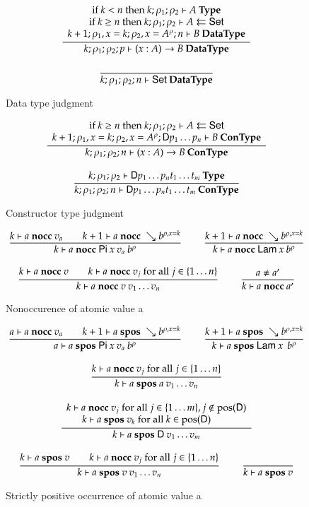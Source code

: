 \newcommand{\nocc}[3]{#1\vdash#2\mbox{ \textbf{nocc} }#3}

\begin{figure}
\begin{gather*}
\ \dfrac{\begin{array}[b]{c}\mbox {if } k < n \mbox{ then } k;\rho_1;\rho_2\vdash A\:\mathbf{Type}\\\mbox {if } k \geq n \mbox { then } k;\rho_1;\rho_2\vdash A\leftleftarrows\mathsf{Set}\\k+1;\rho_1,x=k;\rho_2,x=A^{\rho};n\vdash B\:\mathbf{Data Type}\end{array}}{k;\rho_1;\rho_2;p\vdash( x : A ) \rightarrow{B}\:\mathbf{Data Type}}
\\[2ex]
\ \dfrac{}{k;\rho_1;\rho_2;n\vdash\mathsf{Set}\:\mathbf{Data Type}}
\end{gather*}
\caption{Data type judgment}
\end{figure}

\begin{figure}
\begin{gather*}
\ \dfrac{\begin{array}[b]{c}\mbox {if } k \geq n \mbox { then } k;\rho_1;\rho_2\vdash A\leftleftarrows\mathsf{Set}\\k+1;\rho_1,x=k;\rho_2,x=A^{\rho};\mathsf{D} p_1 \ldots p_n\vdash B\:\mathbf{Con Type}\end{array}}{k;\rho_1;\rho_2;n\vdash( x : A ) \rightarrow{B}\:\mathbf{Con Type}}
\\[2ex]
\ \dfrac{k;\rho_1;\rho_2\vdash\mathsf{D} p_1 \ldots p_n t_1 \ldots t_m\:\mathbf{Type}}{k;\rho_1;\rho_2;n\vdash\mathsf{D} p_1 \ldots p_n t_1 \ldots t_m\:\mathbf{Con Type}}
\end{gather*}
\caption{Constructor type judgment}
\end{figure}


\begin{figure}
\begin{gather*}
\nru{}
{\nocc{k}{a}{v_a} \qquad \nocc{k+1}{a}{\wh \cl{b}{\ins{\rho}{x}{k}}}}
{\nocc{k}{a}{\vpi \: x \: v_a \: \cl{b}{\rho}}  }
\qquad
\nru{}
{\nocc{k+1}{a}{\wh \cl{b}{\ins{\rho}{x}{k}}}}
{\nocc{k}{a}{\vlam \: x \: \cl{b}{\rho}}  }
\\[2ex]
\nru{}
{\nocc{k}{a}{v} \qquad \nocc{k}{a}{v_j} \mbox{ for all } j \in \{1 \ldots n \}}
{\nocc{k}{a}{v \: v_1 \ldots v_n}}
\qquad
\nru{}
{a \neq a'}
{\nocc{k}{a}{a'}}
\end{gather*}
\caption{Nonoccurence of atomic value a}
\end{figure}

\begin{figure}
\begin{gather*}
\nru{}
{ \nocc{a}{a}{v_a} \qquad \spos{k+1}{a}{\wh \cl{b}{\ins{\rho}{x}{k}}}}
{\spos{a}{a}{\vpi \: x \: v_a \: \cl{b}{\rho}}  }
\qquad
\nru{}
{\spos{k+1}{a}{\wh \cl{b}{\ins{\rho}{x}{k}}}}
{\spos{k}{a}{\vlam \: x \: \: \cl{b}{\rho}}  }
\\[2ex]
\nru{}
{\nocc{k}{a}{v_j} \mbox{ for all } j \in \{1 \ldots n \}} 
{\spos{k}{a}{a \: v_1 \ldots v_n}}
\\[2ex]
\ndru{}
{\nocc{k}{a}{v_j} \mbox{ for all } j \in \{ 1 \ldots m\} , j \notin \pos(\DD)}
{\spos{k}{a}{v_k} \mbox{ for all } k \in \pos(\DD) \qquad}
{\spos{k}{a}{\DD \: v_1 \ldots v_m}}
\\[2ex]
\nru{}
{\spos{k}{a}{v} \qquad \nocc{k}{a}{v_j} \mbox{ for all } j \in \{1 \ldots n \}}
{\spos{k}{a}{v \: v_1 \ldots v_n}}
\qquad
\nru{}
{}
{\spos{k}{a}{v}}
\end{gather*}
\caption{Strictly positive occurrence of atomic value a}
\end{figure}


